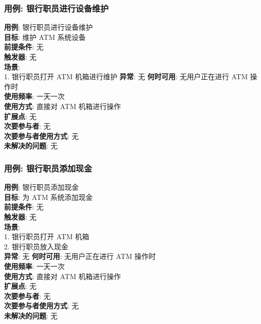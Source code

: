 \documentclass[UTF8]{article}
\begin{document}
\subsubsection{用例: 银行职员进行设备维护}
\noindent
\textbf{用例}: 银行职员进行设备维护
\\
\textbf{目标}: 维护 ATM 系统设备
\\
\textbf{前提条件}: 无
\\
\textbf{触发器}: 无
\\
\textbf{场景}: \\
	\hspace*{2em} 1. 银行职员打开 ATM 机箱进行维护
\textbf{异常}: 无
\textbf{何时可用}: 无用户正在进行 ATM 操作时
\\
\textbf{使用频率}: 一天一次
\\
\textbf{使用方式}: 直接对 ATM 机箱进行操作 \\
\textbf{扩展点}: 无
\\
\textbf{次要参与者}: 无
\\
\textbf{次要参与者使用方式}: 无
\\
\textbf{未解决的问题}: 无
			
			
\subsubsection{用例: 银行职员添加现金}
\noindent
\textbf{用例}: 银行职员添加现金
\\
\textbf{目标}: 为 ATM 系统添加现金
\\
\textbf{前提条件}: 无
\\
\textbf{触发器}: 无
\\
\textbf{场景}: \\
	\hspace*{2em} 1. 银行职员打开 ATM 机箱 \\
	\hspace*{2em} 2. 银行职员放入现金 \\
\textbf{异常}: 无
\textbf{何时可用}: 无用户正在进行 ATM 操作时
\\
\textbf{使用频率}: 一天一次
\\
\textbf{使用方式}: 直接对 ATM 机箱进行操作 \\
\textbf{扩展点}: 无
\\
\textbf{次要参与者}: 无
\\
\textbf{次要参与者使用方式}: 无
\\
\textbf{未解决的问题}: 无
		
\end{document}
